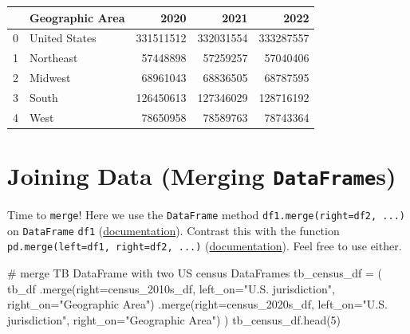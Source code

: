 \documentclass[
  letterpaper,
  DIV=11,
  numbers=noendperiod]{scrreprt}
\newenvironment{Shaded}{\begin{snugshade}}{\end{snugshade}}
\newcommand{\CommentTok}[1]{\textcolor[rgb]{0.37,0.37,0.37}{#1}}
\newcommand{\DecValTok}[1]{\textcolor[rgb]{0.68,0.00,0.00}{#1}}
\newcommand{\NormalTok}[1]{\textcolor[rgb]{0.00,0.23,0.31}{#1}}
\newcommand{\OperatorTok}[1]{\textcolor[rgb]{0.37,0.37,0.37}{#1}}
\newcommand{\StringTok}[1]{\textcolor[rgb]{0.13,0.47,0.30}{#1}}
\begin{document}
\begin{tabular}{llrrr}
\toprule
{} & Geographic Area &       2020 &       2021 &       2022 \\
\midrule
0 &   United States &  331511512 &  332031554 &  333287557 \\
1 &       Northeast &   57448898 &   57259257 &   57040406 \\
2 &         Midwest &   68961043 &   68836505 &   68787595 \\
3 &           South &  126450613 &  127346029 &  128716192 \\
4 &            West &   78650958 &   78589763 &   78743364 \\
\bottomrule
\end{tabular}

\hypertarget{joining-data-merging-dataframes}{%
\section{\texorpdfstring{Joining Data (Merging
\texttt{DataFrame}s)}{Joining Data (Merging DataFrames)}}\label{joining-data-merging-dataframes}}

Time to \texttt{merge}! Here we use the \texttt{DataFrame} method
\texttt{df1.merge(right=df2,\ ...)} on \texttt{DataFrame} \texttt{df1}
(\href{https://pandas.pydata.org/docs/reference/api/pandas.DataFrame.merge.html}{documentation}).
Contrast this with the function
\texttt{pd.merge(left=df1,\ right=df2,\ ...)}
(\href{https://pandas.pydata.org/docs/reference/api/pandas.merge.html?highlight=pandas\%20merge\#pandas.merge}{documentation}).
Feel free to use either.

\begin{Shaded}
\begin{Highlighting}[]
\CommentTok{\# merge TB DataFrame with two US census DataFrames}
\NormalTok{tb\_census\_df }\OperatorTok{=}\NormalTok{ (}
\NormalTok{    tb\_df}
\NormalTok{    .merge(right}\OperatorTok{=}\NormalTok{census\_2010s\_df,}
\NormalTok{           left\_on}\OperatorTok{=}\StringTok{"U.S. jurisdiction"}\NormalTok{, right\_on}\OperatorTok{=}\StringTok{"Geographic Area"}\NormalTok{)}
\NormalTok{    .merge(right}\OperatorTok{=}\NormalTok{census\_2020s\_df,}
\NormalTok{           left\_on}\OperatorTok{=}\StringTok{"U.S. jurisdiction"}\NormalTok{, right\_on}\OperatorTok{=}\StringTok{"Geographic Area"}\NormalTok{)}
\NormalTok{)}
\NormalTok{tb\_census\_df.head(}\DecValTok{5}\NormalTok{)}
\end{Highlighting}
\end{Shaded}
\end{document}
